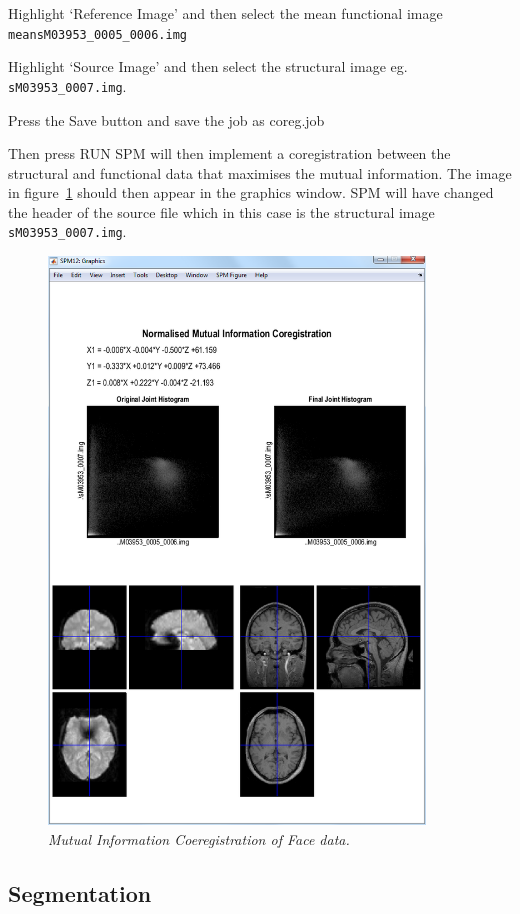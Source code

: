 \bi
\item{Highlight `Reference Image' and then select the
 mean functional image
\verb!meansM03953_0005_0006.img!}
\item{Highlight `Source Image' and then select 
the structural image eg. \verb!sM03953_0007.img!.}
\item{Press the Save button and save the job as 
{\sf coreg.job}}
\item{Then press RUN}
\ei
SPM will then implement a coregistration between the structural and functional data that maximises the mutual
information. The image in figure~\ref{face_coreg} should then appear 
in the graphics window. SPM will have changed the header 
of the source file which in this case is the 
structural image \verb!sM03953_0007.img!.
\begin{figure}
\begin{center}
\includegraphics[width=100mm]{faces/coreg}
\caption{\em Mutual Information Coeregistration of Face data. \label{face_coreg}}
\end{center}
\end{figure}

\subsection{Segmentation}

